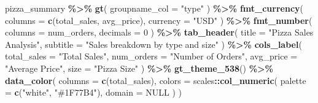 \documentclass[
]{article}
\newenvironment{Shaded}{\begin{snugshade}}{\end{snugshade}}
\newcommand{\AttributeTok}[1]{\textcolor[rgb]{0.13,0.29,0.53}{#1}}
\newcommand{\ConstantTok}[1]{\textcolor[rgb]{0.56,0.35,0.01}{#1}}
\newcommand{\DecValTok}[1]{\textcolor[rgb]{0.00,0.00,0.81}{#1}}
\newcommand{\FunctionTok}[1]{\textcolor[rgb]{0.13,0.29,0.53}{\textbf{#1}}}
\newcommand{\NormalTok}[1]{#1}
\newcommand{\SpecialCharTok}[1]{\textcolor[rgb]{0.81,0.36,0.00}{\textbf{#1}}}
\newcommand{\StringTok}[1]{\textcolor[rgb]{0.31,0.60,0.02}{#1}}
\begin{document}
\begin{Shaded}
\begin{Highlighting}[]
\NormalTok{pizza\_summary }\SpecialCharTok{\%\textgreater{}\%}
  \FunctionTok{gt}\NormalTok{(}
    \AttributeTok{groupname\_col =} \StringTok{"type"}
\NormalTok{  ) }\SpecialCharTok{\%\textgreater{}\%}
  \FunctionTok{fmt\_currency}\NormalTok{(}
    \AttributeTok{columns =} \FunctionTok{c}\NormalTok{(total\_sales, avg\_price),}
    \AttributeTok{currency =} \StringTok{"USD"}
\NormalTok{  ) }\SpecialCharTok{\%\textgreater{}\%}
  \FunctionTok{fmt\_number}\NormalTok{(}
    \AttributeTok{columns =}\NormalTok{ num\_orders,}
    \AttributeTok{decimals =} \DecValTok{0}
\NormalTok{  ) }\SpecialCharTok{\%\textgreater{}\%}
  \FunctionTok{tab\_header}\NormalTok{(}
    \AttributeTok{title =} \StringTok{"Pizza Sales Analysis"}\NormalTok{,}
    \AttributeTok{subtitle =} \StringTok{"Sales breakdown by type and size"}
\NormalTok{  ) }\SpecialCharTok{\%\textgreater{}\%}
  \FunctionTok{cols\_label}\NormalTok{(}
    \AttributeTok{total\_sales =} \StringTok{"Total Sales"}\NormalTok{,}
    \AttributeTok{num\_orders =} \StringTok{"Number of Orders"}\NormalTok{,}
    \AttributeTok{avg\_price =} \StringTok{"Average Price"}\NormalTok{,}
    \AttributeTok{size =} \StringTok{"Pizza Size"}
\NormalTok{  ) }\SpecialCharTok{\%\textgreater{}\%}
  \FunctionTok{gt\_theme\_538}\NormalTok{() }\SpecialCharTok{\%\textgreater{}\%}
  \FunctionTok{data\_color}\NormalTok{(}
    \AttributeTok{columns =} \FunctionTok{c}\NormalTok{(total\_sales),}
    \AttributeTok{colors =}\NormalTok{ scales}\SpecialCharTok{::}\FunctionTok{col\_numeric}\NormalTok{(}
      \AttributeTok{palette =} \FunctionTok{c}\NormalTok{(}\StringTok{"white"}\NormalTok{, }\StringTok{"\#1F77B4"}\NormalTok{),}
      \AttributeTok{domain =} \ConstantTok{NULL}
\NormalTok{    )}
\NormalTok{  )}
\end{Highlighting}
\end{Shaded}
\end{document}
